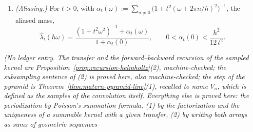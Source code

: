 \begin{proposition}
\begin{enumerate}
$L_{ctq^k}$, so the step from $t$ to $q^nt$ is $L_{ct} * L_{ctq} * \dots * L_{ctq^{n-1}}$. Let
$V_n$ be its samples on $q^nh\ZZ$, renormalized to unit mass, the \emph{sampled step}. The pyramid
is computed by
\[
  u_{k+1}(m) := (g * u_k)(qm), \qquad m \in \ZZ ,
\]
one forward and one backward recursion on the current grid $q^kh\ZZ$ followed by decimation, with
the same coefficients at every level. Let $U_n$ be $u_n$ computed from $u_0 = \delta_0$ and
renormalized to unit mass. Then $U_n$ is, up to a constant, the restriction to $q^nh\ZZ$ of the
convolution of the sampled factors, $L_{ctq^k}$ sampled on $q^kh\ZZ$ for $k < n$, while $V_n$ is the
sample of their convolution. The computation is exact in sense (i) at the first level,
$U_1 = V_1$, and at no later one: for every $n \ge 2$ and every $h, c, t > 0$, $U_n \ne V_n$.
\item \emph{(Aliasing.)} For $t > 0$, with
$\alpha_t(\omega) := \sum_{n \ne 0}\bigl(1 + t^2(\omega + 2\pi n/h)^2\bigr)^{-1}$, the aliased mass,
\[
  \widehat\lambda_t(h\omega) = \frac{(1 + t^2\omega^2)^{-1} + \alpha_t(\omega)}{1 + \alpha_t(0)} ,
  \qquad 0 < \alpha_t(0) < \frac{h^2}{12\,t^2} .
\]
\end{enumerate}
\statusT\quad\emph{(No ledger entry. The transfer and the forward--backward recursion of the
sampled kernel are Proposition~\ref{prop:recursion-helmholtz}(2), machine-checked; the subsampling
sentence of (2) is proved here, also machine-checked; the step
of the \Matern{} pyramid is Theorem~\ref{thm:matern-pyramid-line}(1), recalled to name $V_n$, which
is defined as the samples of the convolution itself. Everything else is proved here: the
periodization by Poisson's summation formula, (1) by the factorization and the uniqueness of a
summable kernel with a given transfer, (2) by writing both arrays as sums of geometric sequences
}
\end{proposition}
